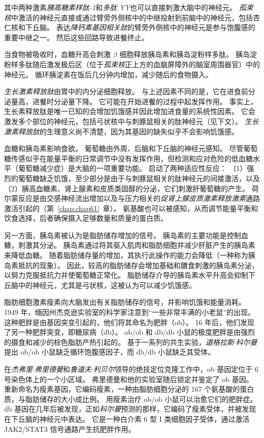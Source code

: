 其中两种激素\textit{胰高糖素样肽-1}和\textit{多肽 YY}也可以直接刺激大脑中的神经元。
\textit{孤束核}中激活的神经元直接或通过臂旁外侧核中的中继投射到前脑中的神经元，包括杏仁核和下丘脑。
表达\textit{降钙素基因相关肽}的臂旁外侧核中的神经元是参与饱腹感的重要中继之一。
然后这些回路导致进餐终止。


当食物被吸收时，血糖升高会刺激 $ \beta $ 细胞释放胰岛素和胰岛淀粉样多肽。
胰岛淀粉样多肽随后激发极后区（位于\textit{孤束核}正上方的血脑屏障外的脑室周围器官）中的神经元。
循环胰淀素在饭后几分钟内增加，减少随后的食物摄入。


\textit{生长激素释放肽}由胃中的内分泌细胞释放。
与上述因素不同的是，它在进食前分泌量高，进餐时分泌量下降。
它可能在开始进餐的过程中起发挥作用。
事实上，生长素释放肽是唯一已知的会增加饥饿感并因此增加进食量的系统性因素。
它会激发多个部位的神经元，包括弓状核中与刺豚鼠相关的肽神经元（见下文）。
\textit{生长激素释放肽}的生理意义尚不清楚，因为其基因的缺失似乎不会影响饥饿感。


血糖和胰岛素影响食欲。
葡萄糖由外周、后脑和下丘脑的神经元感知。
尽管葡萄糖传感似乎在能量平衡的日常调节中没有发挥作用，但检测和应对危险的低血糖水平（葡萄糖减少症）是大脑的一项重要功能。
启动了两种适应性反应：
（1）强烈的葡萄糖缺乏饥饿，至少部分是由于与刺豚鼠相关的肽神经元的间接激活，以及（2）胰高血糖素、肾上腺素和皮质类固醇的分泌，它们刺激肝葡萄糖的产生。
荷尔蒙反应是由交感神经流出增加以及与压力相关的\textit{促肾上腺皮质激素释放激素}通路激活引起的（第~\ref{chap:chap61}~章）。
氨基酸也可以被感知，从而调节能量平衡和饮食选择，后者确保摄入足够数量和质量的蛋白质。


另一方面，胰岛素被认为是脂肪储存增加的信号。
胰岛素的主要功能是控制血糖，刺激其分泌。
胰岛素通过将其驱入肌肉和脂肪细胞并减少肝脏产生的胰岛素来降低血糖。
随着脂肪储存量的增加，其执行此操作的能力会降低（一种称为胰岛素抵抗的现象）。
因此，较高的脂肪储存会增加基础和膳食刺激的胰岛素分泌，以努力克服抵抗力并使葡萄糖正常化。
脂肪储存介导的胰岛素水平升高会抑制下丘脑中的神经元，尤其是弓状核，这被认为可以减少饥饿感。


脂肪细胞激素瘦素向大脑发出有关脂肪储存的信号，并影响饥饿和能量消耗。
1949 年，缅因州杰克逊实验室的科学家注意到“一些非常丰满的小老鼠”的出现。
这种肥胖是由基因突变引起的，他们将其命名为肥胖（ob）。
16 年后，他们发现了另一种肥胖突变，即糖尿病（db）。
ob/ob 和 db/db 小鼠的极度肥胖是由强烈的摄食和减少的棕色脂肪产热引起的。
基于一系列的共生实验，\textit{道格拉斯$\cdot$科尔曼}提出 ob/ob 小鼠缺乏循环饱腹感因子，而 db/db 小鼠缺乏其受体。


在\textit{杰弗里$\cdot$弗里德曼}和\textit{鲁道夫$\cdot$利贝尔}领导的绝技定位克隆工作中，ob 基因定位于 6 号染色体上的一个小区域。
弗里德曼和他的实验室随后锁定并鉴定了 ob 基因。
重新命名为瘦素基因，它编码瘦素，一种由脂肪细胞分泌的 167 个氨基酸的蛋白质，与脂肪储存的大小成比例。
用瘦素治疗 ob/ob 小鼠可以治愈它们的肥胖症。
db 基因在几年后被发现，正如\textit{科尔曼}预测的那样，它编码了瘦素受体，并被发现在下丘脑的神经元中表达。
它是一种白介素 6 型 I 类细胞因子受体，通过激活 JAK2/STAT3 信号通路产生抗肥胖作用。



